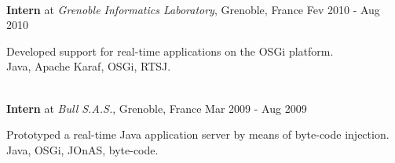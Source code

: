 \documentclass[margin]{res}
\begin{document}
\begin{resume}
\begin{small}
        		         \end{small}
               		\vspace{1mm}\\
	                \textbf{Intern} at {\sl Grenoble Informatics Laboratory}, Grenoble, France \hfill Fev 2010 - Aug 2010 \\
        		         \begin{small}
                 		{\color{darkgray} Developed support for real-time applications on the OSGi platform.}\\
				{\color{gray}Java, Apache Karaf, OSGi, RTSJ.}
	                 \end{small}
			\vspace{1mm}\\                 
                		\textbf{Intern} at {\sl Bull S.A.S.}, Grenoble, France \hfill Mar 2009 - Aug 2009 \\
	                \begin{small}
                			{\color{darkgray} Prototyped a real-time Java application server by means of byte-code injection.}\\
				{\color{gray}Java, OSGi, JOnAS, byte-code.}
        		        \end{small}
                		\vspace{1mm}\\                 
		\vspace{-8mm}

\end{resume}
\end{document}

